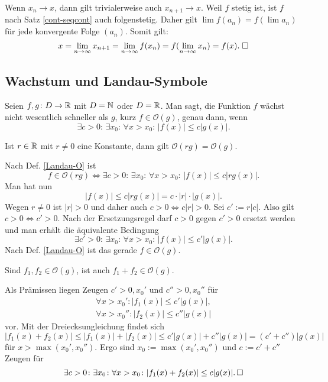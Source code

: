 \begin{Beweis}
Wenn $x_n\to x$, dann gilt trivialerweise auch $x_{n+1}\to x$.
Weil $f$ stetig ist, ist $f$ nach Satz \ref{cont-seqcont}
auch folgenstetig. Daher gilt $\lim f(a_n) = f(\lim a_n)$ für jede
konvergente Folge $(a_n)$. Somit gilt:
\[x=\lim_{n\to\infty} x_{n+1} = \lim_{n\to\infty} f(x_n)
= f(\lim_{n\to\infty} x_n) = f(x).\;\square\]
\end{Beweis}

\subsection{Wachstum und Landau-Symbole}
\begin{Definition}\label{Landau-O}
Seien $f,g\colon D\to\mathbb R$ mit $D=\mathbb N$ oder $D=\mathbb R$. Man sagt, die
Funktion $f$ wächst nicht wesentlich schneller als $g$, kurz
$f\in\mathcal O(g)$, genau dann, wenn
\[\exists c{>}0\colon\,\exists x_0\colon\,\forall x{>}x_0\colon\, |f(x)|\le c|g(x)|.\]
\end{Definition}

\begin{Satz}
Ist $r\in\mathbb R$ mit $r\ne 0$ eine Konstante, dann gilt
$\mathcal O(rg)=\mathcal O(g)$.
\end{Satz}
\begin{Beweis}
Nach Def. \ref{Landau-O} ist
\[f\in\mathcal O(rg) \iff 
\exists c{>}0\colon\,\exists x_0\colon\,\forall x{>}x_0\colon\,|f(x)|\le c|rg(x)|.\]
Man hat nun
\[|f(x)|\le c|rg(x)| = c\cdot |r|\cdot |g(x)|.\]
Wegen $r\ne 0$ ist $|r|>0$ und daher auch $c>0\iff c|r|>0$. Sei
$c':=r|c|$. Also gilt $c>0\iff c'>0$. Nach der Ersetzungsregel
darf $c>0$ gegen $c'>0$ ersetzt werden und man erhält die
äquivalente Bedingung
\[\exists c'{>}0\colon\,\exists x_0\colon\,
\forall x{>}x_0\colon\,|f(x)|\le c'|g(x)|.\]
Nach Def. \ref{Landau-O} ist das gerade $f\in\mathcal O(g)$.\;\qedsymbol
\end{Beweis}

\begin{Satz}
Sind $f_1,f_2\in\mathcal O(g)$, ist auch $f_1+f_2\in\mathcal O(g)$.
\end{Satz}
\begin{Beweis}
Als Prämissen liegen Zeugen $c'>0,x_0'$ und $c''>0,x_0''$ für
\begin{gather*}
\forall x>x_0'\colon |f_1(x)|\le c'|g(x)|,\\
\forall x>x_0''\colon |f_2(x)|\le c''|g(x)|
\end{gather*}
vor. Mit der Dreiecksungleichung findet sich
\[|f_1(x)+f_2(x)|\le |f_1(x)|+|f_2(x)| \le c'|g(x)|+c''|g(x)| = (c'+c'')|g(x)|\]
für $x>\max(x_0',x_0'')$. Ergo sind $x_0:=\max(x_0',x_0'')$ und $c:=c'+c''$
Zeugen für
\[\exists c>0\colon\exists x_0\colon\forall x>x_0\colon |f_1(x)+f_2(x)|\le c|g(x)|.\,\square\]
\end{Beweis}

